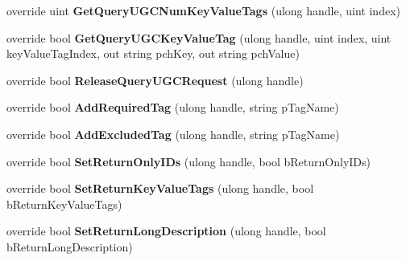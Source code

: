 \begin{DoxyCompactItemize}
override uint {\bfseries Get\+Query\+U\+G\+C\+Num\+Key\+Value\+Tags} (ulong handle, uint index)
\item 
\mbox{\label{class_valve_1_1_steamworks_1_1_c_steam_u_g_c_a7a6286a5d193832a5943e5b189fc3d6a}} 
override bool {\bfseries Get\+Query\+U\+G\+C\+Key\+Value\+Tag} (ulong handle, uint index, uint key\+Value\+Tag\+Index, out string pch\+Key, out string pch\+Value)
\item 
\mbox{\label{class_valve_1_1_steamworks_1_1_c_steam_u_g_c_a1245067bce6415a8d69ce98b9cfb32e6}} 
override bool {\bfseries Release\+Query\+U\+G\+C\+Request} (ulong handle)
\item 
\mbox{\label{class_valve_1_1_steamworks_1_1_c_steam_u_g_c_a0dd3f3343a05669d39ece7d0cd6a9b7e}} 
override bool {\bfseries Add\+Required\+Tag} (ulong handle, string p\+Tag\+Name)
\item 
\mbox{\label{class_valve_1_1_steamworks_1_1_c_steam_u_g_c_aa38eefddf8aa16b7556c395a7bc2878b}} 
override bool {\bfseries Add\+Excluded\+Tag} (ulong handle, string p\+Tag\+Name)
\item 
\mbox{\label{class_valve_1_1_steamworks_1_1_c_steam_u_g_c_a3cedb310dea6b61ba5bfd8d8c9453667}} 
override bool {\bfseries Set\+Return\+Only\+I\+Ds} (ulong handle, bool b\+Return\+Only\+I\+Ds)
\item 
\mbox{\label{class_valve_1_1_steamworks_1_1_c_steam_u_g_c_a0df4103e4f6f4c4f64ae99dd528f6e5e}} 
override bool {\bfseries Set\+Return\+Key\+Value\+Tags} (ulong handle, bool b\+Return\+Key\+Value\+Tags)
\item 
\mbox{\label{class_valve_1_1_steamworks_1_1_c_steam_u_g_c_aedc9a016fda28bdee653a02b8ffb3f98}} 
override bool {\bfseries Set\+Return\+Long\+Description} (ulong handle, bool b\+Return\+Long\+Description)
\item 
\mbox{\label{class_valve_1_1_steamworks_1_1_c_steam_u_g_c_a5f527738ef3b2fccdc435b3d71b43675}} 

\end{DoxyCompactItemize}
